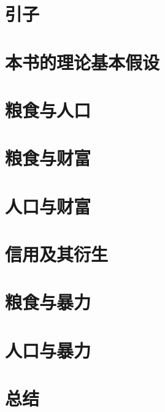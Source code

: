 \section{引子}
\section{本书的理论基本假设}
\section{粮食与人口}
\section{粮食与财富}
\section{人口与财富}
\section{信用及其衍生}
\section{粮食与暴力}
\section{人口与暴力}
\section{总结}

